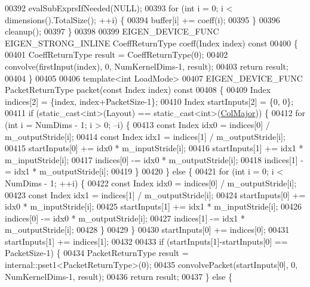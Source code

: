 \begin{DoxyCode}
00392     evalSubExprsIfNeeded(NULL);
00393     \textcolor{keywordflow}{for} (\textcolor{keywordtype}{int} i = 0; i < dimensions().TotalSize(); ++i) \{
00394       buffer[i] += coeff(i);
00395     \}
00396     cleanup();
00397   \}
00398 
00399   EIGEN\_DEVICE\_FUNC EIGEN\_STRONG\_INLINE CoeffReturnType coeff(Index index)\textcolor{keyword}{ const}
00400 \textcolor{keyword}{  }\{
00401     CoeffReturnType result = CoeffReturnType(0);
00402     convolve(firstInput(index), 0, NumKernelDims-1, result);
00403     \textcolor{keywordflow}{return} result;
00404   \}
00405 
00406   \textcolor{keyword}{template}<\textcolor{keywordtype}{int} LoadMode>
00407   EIGEN\_DEVICE\_FUNC PacketReturnType packet(\textcolor{keyword}{const} Index index)\textcolor{keyword}{ const}
00408 \textcolor{keyword}{  }\{
00409     Index indices[2] = \{index, index+PacketSize-1\};
00410     Index startInputs[2] = \{0, 0\};
00411     \textcolor{keywordflow}{if} (static\_cast<int>(Layout) == static\_cast<int>(\hyperlink{group__enums_ggaacded1a18ae58b0f554751f6cdf9eb13a0cbd4bdd0abcfc0224c5fcb5e4f6669a}{ColMajor})) \{
00412       \textcolor{keywordflow}{for} (\textcolor{keywordtype}{int} i = NumDims - 1; i > 0; --i) \{
00413         \textcolor{keyword}{const} Index idx0 = indices[0] / m\_outputStride[i];
00414         \textcolor{keyword}{const} Index idx1 = indices[1] / m\_outputStride[i];
00415         startInputs[0] += idx0 * m\_inputStride[i];
00416         startInputs[1] += idx1 * m\_inputStride[i];
00417         indices[0] -= idx0 * m\_outputStride[i];
00418         indices[1] -= idx1 * m\_outputStride[i];
00419       \}
00420     \} \textcolor{keywordflow}{else} \{
00421       \textcolor{keywordflow}{for} (\textcolor{keywordtype}{int} i = 0; i < NumDims - 1; ++i) \{
00422         \textcolor{keyword}{const} Index idx0 = indices[0] / m\_outputStride[i];
00423         \textcolor{keyword}{const} Index idx1 = indices[1] / m\_outputStride[i];
00424         startInputs[0] += idx0 * m\_inputStride[i];
00425         startInputs[1] += idx1 * m\_inputStride[i];
00426         indices[0] -= idx0 * m\_outputStride[i];
00427         indices[1] -= idx1 * m\_outputStride[i];
00428       \}
00429     \}
00430     startInputs[0] += indices[0];
00431     startInputs[1] += indices[1];
00432 
00433     \textcolor{keywordflow}{if} (startInputs[1]-startInputs[0] == PacketSize-1) \{
00434       PacketReturnType result = internal::pset1<PacketReturnType>(0);
00435       convolvePacket(startInputs[0], 0, NumKernelDims-1, result);
00436       \textcolor{keywordflow}{return} result;
00437     \} \textcolor{keywordflow}{else} \{

\end{DoxyCode}
